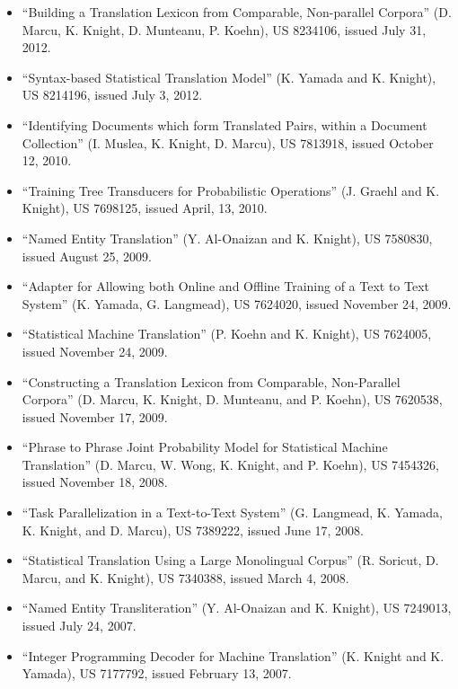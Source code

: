\begin{itemize}
\item ``Building a Translation Lexicon from Comparable, Non-parallel Corpora'' (D. Marcu, K. Knight, D. Munteanu, P. Koehn), 
US 8234106, issued July 31, 2012. 

\item ``Syntax-based Statistical Translation Model'' (K. Yamada and K. Knight),
US 8214196, issued July 3, 2012. 

\item ``Identifying Documents which form Translated Pairs, within a Document Collection'' (I. Muslea, K. Knight, D. Marcu),
US 7813918, issued October 12, 2010.

\item ``Training Tree Transducers for Probabilistic Operations'' (J. Graehl and K. Knight),
US 7698125, issued April, 13, 2010.

\item ``Named Entity Translation'' (Y. Al-Onaizan and K. Knight),
US 7580830, issued August 25, 2009.

\item ``Adapter for Allowing both Online and Offline Training of a
Text to Text System'' (K. Yamada, G. Langmead),
US 7624020, issued November 24, 2009.

\item ``Statistical Machine Translation'' (P. Koehn and K. Knight),
US 7624005, issued November 24, 2009.

\item ``Constructing a Translation Lexicon from Comparable, Non-Parallel
Corpora'' (D. Marcu, K. Knight, D. Munteanu, and P. Koehn),
US 7620538, issued November 17, 2009.

\item ``Phrase to Phrase Joint Probability Model for Statistical 
Machine Translation'' (D. Marcu, W. Wong, K. Knight, and P. Koehn),
US 7454326, issued November 18, 2008.

\item ``Task Parallelization in a Text-to-Text System''
(G. Langmead, K. Yamada, K. Knight, and D. Marcu),
US 7389222, issued June 17, 2008.

\item ``Statistical Translation Using a Large Monolingual Corpus''
(R. Soricut, D. Marcu, and K. Knight),
US 7340388, issued March 4, 2008.

\item ``Named Entity Transliteration'' (Y. Al-Onaizan and K. Knight),
US 7249013, issued July 24, 2007.

\item ``Integer Programming Decoder for Machine Translation''
(K. Knight and K. Yamada),
US 7177792, issued February 13, 2007.
\end{itemize}

